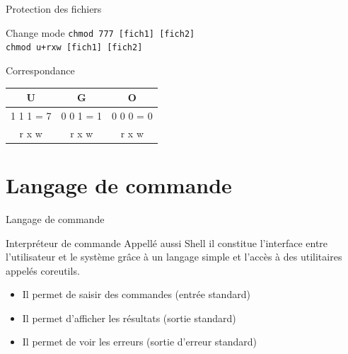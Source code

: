 \begin{frame}{Protection des fichiers}
\begin{block}{Change mode}
\texttt{chmod 777 [fich1] [fich2]}\\
\texttt{chmod u+rxw [fich1] [fich2]}
\end{block}

\begin{block}{Correspondance}
\begin{center}
\begin{tabular}{|c|c|c|}
\hline
U & G & O\\
\hline
1 1 1 = 7 & 0 0 1 = 1 & 0 0 0 = 0 \\
\hline
r x w & r x w & r x w \\
\hline
\end{tabular}
\end{center}
\end{block}

\end{frame}

\section{Langage de commande}

\begin{frame}{Langage de commande}
\begin{block}{Interpréteur de commande}
Appellé aussi Shell il constitue l'interface entre l'utilisateur et le système grâce à un langage simple et l'accès à des utilitaires appelés coreutils.
\begin{itemize}
\item Il permet de saisir des commandes (entrée standard)
\item Il permet d'afficher les résultats (sortie standard)
\item Il permet de voir les erreurs (sortie d'erreur standard)
\end{itemize}
\end{block}
\end{frame}

